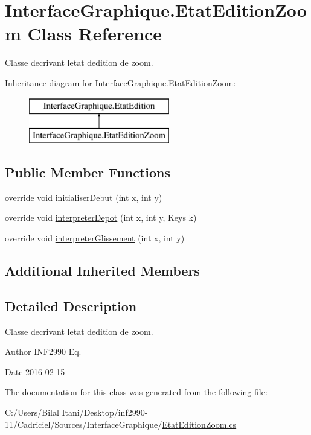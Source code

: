 \hypertarget{class_interface_graphique_1_1_etat_edition_zoom}{}\section{Interface\+Graphique.\+Etat\+Edition\+Zoom Class Reference}
\label{class_interface_graphique_1_1_etat_edition_zoom}


Classe decrivant l\textquotesingle{}etat d\textquotesingle{}edition de zoom.  


Inheritance diagram for Interface\+Graphique.\+Etat\+Edition\+Zoom\+:\begin{figure}[H]
\begin{center}
\leavevmode
\includegraphics[height=2.000000cm]{class_interface_graphique_1_1_etat_edition_zoom}
\end{center}
\end{figure}
\subsection*{Public Member Functions}
\begin{DoxyCompactItemize}
\item 
override void \hyperlink{group__inf2990_ga8d80941bca37245c8f76f6db5d6350fc}{initialiser\+Debut} (int x, int y)
\item 
override void \hyperlink{group__inf2990_ga69f84cb3df5357cba3fc880ba8a61147}{interpreter\+Depot} (int x, int y, Keys k)
\item 
override void \hyperlink{group__inf2990_ga3409e2e6b503aea9e520673c46ef92e7}{interpreter\+Glissement} (int x, int y)
\end{DoxyCompactItemize}
\subsection*{Additional Inherited Members}


\subsection{Detailed Description}
Classe decrivant l\textquotesingle{}etat d\textquotesingle{}edition de zoom. 

\begin{DoxyAuthor}{Author}
I\+N\+F2990 Eq. 
\end{DoxyAuthor}
\begin{DoxyDate}{Date}
2016-\/02-\/15 
\end{DoxyDate}


The documentation for this class was generated from the following file\+:\begin{DoxyCompactItemize}
\item 
C\+:/\+Users/\+Bilal Itani/\+Desktop/inf2990-\/11/\+Cadriciel/\+Sources/\+Interface\+Graphique/\hyperlink{_etat_edition_zoom_8cs}{Etat\+Edition\+Zoom.\+cs}\end{DoxyCompactItemize}
